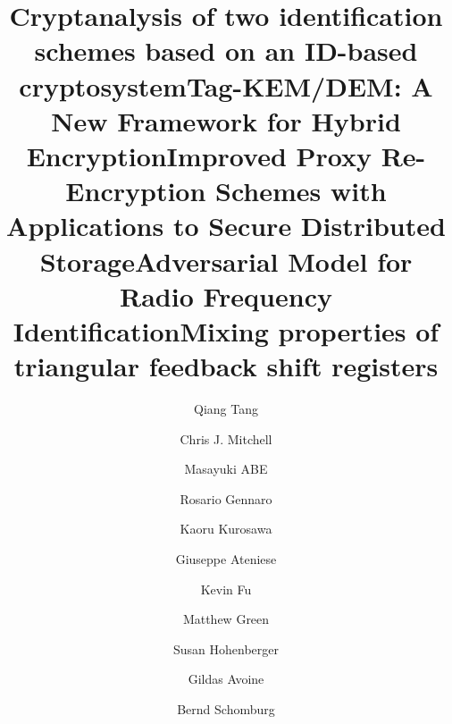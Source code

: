 \documentclass{llncs}
\begin{document}
%
%
%
\tableofcontents
%
\mainmatter              %


\setcounter{page}{1}
\title{Cryptanalysis of two identification schemes based on an ID-based cryptosystem}
\author{Qiang Tang \and  Chris J. Mitchell}
\maketitle
\clearpage

\setcounter{page}{18}
\title{Tag-KEM/DEM: A New Framework for Hybrid Encryption}
\author{Masayuki ABE \and  Rosario Gennaro \and  Kaoru Kurosawa}
\maketitle
\clearpage

\setcounter{page}{40}
\title{Improved Proxy Re-Encryption Schemes with Applications to Secure Distributed Storage}
\author{Giuseppe Ateniese \and  Kevin Fu \and  Matthew Green \and  Susan Hohenberger}
\maketitle
\clearpage

\setcounter{page}{60}
\title{Adversarial Model for Radio Frequency Identification}
\author{Gildas Avoine}
\maketitle
\clearpage

\setcounter{page}{77}
\title{Mixing properties of triangular feedback shift registers}
\author{Bernd Schomburg}
\maketitle
\clearpage
\end{document}
